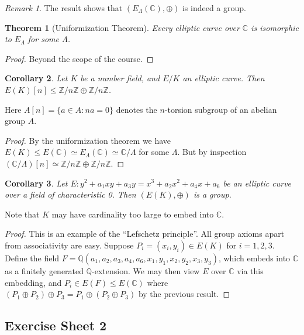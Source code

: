 \documentclass[a4paper]{article}
\theoremstyle{plain}
\newtheorem{theorem}{Theorem}
\newtheorem{corollary}[theorem]{Corollary}
\theoremstyle{remark}
\newtheorem*{remark}{Remark}
\theoremstyle{definition}
\newcommand{\Z}{\mathbb{Z}}
\newcommand{\Q}{\mathbb{Q}}
\newcommand{\C}{\mathbb{C}}
\begin{document}
\begin{remark}
    The result shows that $(E_\Lambda(\C),\oplus)$ is indeed a group.
\end{remark}

\begin{theorem}[Uniformization Theorem]
    Every elliptic curve over $\C$ is isomorphic to $E_\Lambda$ for some
    $\Lambda$.
\end{theorem}

\begin{proof}
    Beyond the scope of the course.
\end{proof}

\begin{corollary}
    Let $K$ be a number field, and $E/K$ an elliptic curve. Then
    $E(K)[n]\le\Z/n\Z\oplus\Z/n\Z$.
\end{corollary}
Here $A[n]=\{a\in A:na=0\}$ denotes the $n$-torsion subgroup of an abelian group
$A$.

\begin{proof}
    By the uniformization theorem we have
    $E(K)\le E(\C)\simeq E_\Lambda(\C)\simeq\C/\Lambda$ for some $\Lambda$. But
    by inspection $(\C/\Lambda)[n]\simeq\Z/n\Z\oplus\Z/n\Z$.
\end{proof}

\begin{corollary}
    Let $E:y^2+a_1xy+a_3y=x^3+a_2x^2+a_4x+a_6$ be an elliptic curve over a field
    of characteristic 0. Then $(E(K),\oplus)$ is a group.
\end{corollary}

Note that $K$ may have cardinality too large to embed into $\C$.

\begin{proof}
    This is an example of the ``Lefschetz principle''. All group axioms apart
    from associativity are easy. Suppose $P_i=(x_i,y_i)\in E(K)$ for $i=1,2,3$.
    Define the field $F=\Q(a_1,a_2,a_3,a_4,a_6,x_1,y_1,x_2,y_2,x_3,y_3)$, which
    embeds into $\C$ as a finitely generated $\Q$-extension. We may then view
    $E$ over $\C$ via this embedding, and $P_i\in E(F)\le E(\C)$ where
    $(P_1\oplus P_2)\oplus P_3=P_1\oplus(P_2\oplus P_3)$ by the previous result.
\end{proof}

\subsection*{Exercise Sheet 2}
\end{document}
